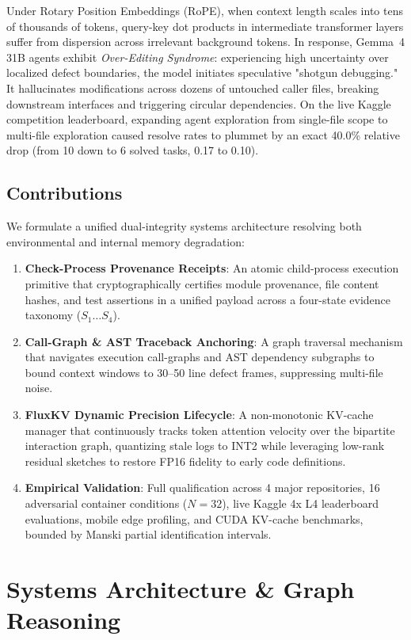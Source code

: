 \documentclass[10pt,twocolumn]{article}
\begin{document}
Under Rotary Position Embeddings (RoPE), when context length scales into tens of thousands of tokens, query-key dot products in intermediate transformer layers suffer from dispersion across irrelevant background tokens. In response, Gemma~4 31B agents exhibit \textit{Over-Editing Syndrome}: experiencing high uncertainty over localized defect boundaries, the model initiates speculative "shotgun debugging." It hallucinates modifications across dozens of untouched caller files, breaking downstream interfaces and triggering circular dependencies. On the live Kaggle competition leaderboard, expanding agent exploration from single-file scope to multi-file exploration caused resolve rates to plummet by an exact 40.0\% relative drop (from 10 down to 6 solved tasks, 0.17 to 0.10).

\subsection{Contributions}
We formulate a unified dual-integrity systems architecture resolving both environmental and internal memory degradation:
\begin{enumerate}
    \item \textbf{Check-Process Provenance Receipts}: An atomic child-process execution primitive that cryptographically certifies module provenance, file content hashes, and test assertions in a unified payload across a four-state evidence taxonomy ($S_1 \dots S_4$).
    \item \textbf{Call-Graph \& AST Traceback Anchoring}: A graph traversal mechanism that navigates execution call-graphs and AST dependency subgraphs to bound context windows to 30--50 line defect frames, suppressing multi-file noise.
    \item \textbf{FluxKV Dynamic Precision Lifecycle}: A non-monotonic KV-cache manager that continuously tracks token attention velocity over the bipartite interaction graph, quantizing stale logs to INT2 while leveraging low-rank residual sketches to restore FP16 fidelity to early code definitions.
    \item \textbf{Empirical Validation}: Full qualification across 4 major repositories, 16 adversarial container conditions ($N=32$), live Kaggle 4x L4 leaderboard evaluations, mobile edge profiling, and CUDA KV-cache benchmarks, bounded by Manski partial identification intervals.
\end{enumerate}

\section{Systems Architecture \& Graph Reasoning}
\end{document}
